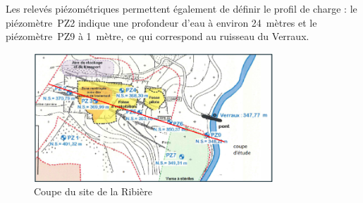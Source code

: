 \documentclass{article}
\newcommand{\blue}[1]{\textcolor{blue}{#1}} %
\begin{document}
Les relevés piézométriques permettent également de définir le profil de charge : le piézomètre~PZ2 indique une profondeur d’eau à environ 24~mètres et le piézomètre~PZ9 à 1~mètre, ce qui correspond au ruisseau du Verraux.



\begin{figure}[H]
    \centering
    \includegraphics[width =0.8\textwidth]{III_B_3_2.png} 
    \caption{Coupe du site de la Ribière}
    \label{fig:coupe_site_ribiere}
\end{figure}
\end{document}
